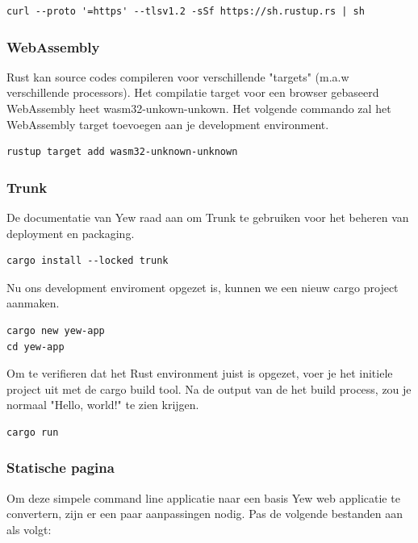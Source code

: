 \begin{verbatim}
curl --proto '=https' --tlsv1.2 -sSf https://sh.rustup.rs | sh
\end{verbatim}

\subsubsection{WebAssembly}

Rust kan source codes compileren voor verschillende "targets" (m.a.w verschillende processors). Het
compilatie target voor een browser gebaseerd WebAssembly heet wasm32-unkown-unkown. Het volgende
commando zal het WebAssembly target toevoegen aan je development environment.

\begin{verbatim}
rustup target add wasm32-unknown-unknown
\end{verbatim}

\clearpage

\subsubsection{Trunk}

De documentatie van Yew raad aan om Trunk te gebruiken voor het beheren van deployment en packaging.

\begin{verbatim}
cargo install --locked trunk
\end{verbatim}

Nu ons development enviroment opgezet is, kunnen we een nieuw cargo project aanmaken.

\begin{verbatim}
cargo new yew-app
cd yew-app
\end{verbatim}

Om te verifieren dat het Rust environment juist is opgezet, voer je het initiele project uit met de
cargo build tool. Na de output van de het build process, zou je normaal "Hello, world!" te zien
krijgen.

\begin{verbatim}
cargo run
\end{verbatim}

\subsubsection{Statische pagina}

Om deze simpele command line applicatie naar een basis Yew web applicatie te convertern, zijn er een
paar aanpassingen nodig. Pas de volgende bestanden aan als volgt:

